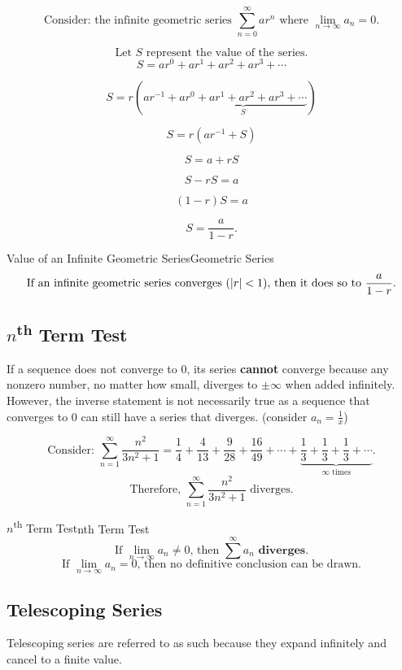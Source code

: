 \documentclass[10pt]{article}
\theoremstyle{definition}
\DeclarePairedDelimiter{\abs}{\lvert}{\rvert}
\begin{document}
\[\text{Consider: the infinite geometric series } \sum_{n=0}^{\infty} ar^n \text{ where } \lim_{n \to \infty} a_n=0.\]

\[\text{Let $S$ represent the value of the series.}\]
\[S=ar^0+ar^1+ar^2+ar^3+\cdots\]

\[S=r(ar^{-1}+\underbrace{ar^0+ar^1+ar^2+ar^3+\cdots}_ {S})\] 

\[S=r(ar^{-1}+S)\]

\[S=a+rS\]

\[S-rS=a\]

\[(1-r)S=a\]

\[S=\frac{a}{1-r}.\]

\begin{theorem}{Value of an Infinite Geometric Series}{Geometric Series}
\vspace{-0.3cm}
    \[\text{If an infinite geometric series converges ($\abs{r}<1$), then it does so to } \frac{a}{1-r}.\]
\end{theorem}

\subsection{$n$\textsuperscript{th} Term Test}
If a sequence does not converge to 0, its series \textbf{cannot} converge because any nonzero number, no matter how small, diverges to $\pm \infty$ when added infinitely. However, the inverse statement is not necessarily true as a sequence that converges to 0 can still have a series that diverges. (consider $a_n=\frac{1}{x}$)

\[\text{Consider: } \sum_{n=1}^{\infty} \frac{n^2}{3n^2+1}=\frac{1}{4}+\frac{4}{13}+\frac{9}{28}+\frac{16}{49}+\cdots + \underbrace{\frac{1}{3}+\frac{1}{3}+\frac{1}{3}+\cdots}_{\infty \text{ times}}.\]
\[\text{Therefore, } \sum_{n=1}^{\infty} \frac{n^2}{3n^2+1} \text{ diverges.}\]

\begin{theorem}{$n$\textsuperscript{th} Term Test}{nth Term Test}
    \[\text{If } \lim_{n \to \infty} a_n \not= 0 \text{, then } \sum^{\infty} a_n \textbf{ diverges.}\]
    \[\text{If } \lim_{n \to \infty} a_n     = 0 \text{, then no definitive conclusion can be drawn.}\]
\end{theorem}

\subsection{Telescoping Series}
Telescoping series are referred to as such because they expand infinitely and cancel to a finite value.
\end{document}
